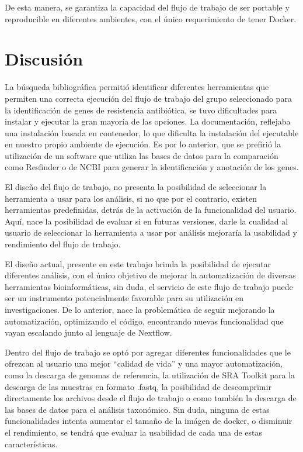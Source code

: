 \documentclass[12pt]{article}
\begin{document}
De esta manera, se garantiza la capacidad del flujo de trabajo de ser portable y 
reproducible en diferentes ambientes, con el único requerimiento de tener Docker.

\newpage
\section{Discusión}
La búsqueda bibliográfica permitió identificar diferentes herramientas que permiten
 una correcta ejecución del flujo de trabajo del grupo seleccionado para la 
 identificación de genes de resistencia antibiótica, se tuvo dificultades para 
 instalar y ejecutar la gran mayoría de las opciones. La documentación, reflejaba 
 una instalación basada en contenedor, lo que dificulta la instalación del ejecutable 
 en nuestro propio ambiente de ejecución. Es por lo anterior, que se prefirió la utilización 
 de un software que utiliza las bases de datos para la comparación como Resfinder 
 o de NCBI para generar la identificación y anotación de los genes. 

El diseño del flujo de trabajo, no presenta la posibilidad de seleccionar la 
herramienta a usar para los análisis, si no que por el contrario, existen 
herramientas predefinidas, detrás de la activación de la funcionalidad del usuario. 
Aquí, nace la posibilidad  de evaluar si en futuras versiones, darle la 
cualidad al usuario de seleccionar la herramienta a usar por análisis mejoraría 
la usabilidad y rendimiento del flujo de trabajo. 

El diseño actual, presente en este trabajo brinda la posibilidad de 
ejecutar diferentes análisis, con el único objetivo de mejorar la automatización de 
diversas herramientas bioinformáticas, sin duda, el servicio de este flujo de trabajo 
puede ser un instrumento potencialmente favorable para su utilización en 
investigaciones. De lo anterior, nace la problemática de seguir mejorando la 
automatización, optimizando el código, encontrando nuevas funcionalidad que vayan 
escalando junto al lenguaje de Nextflow.

Dentro del flujo de trabajo se optó por agregar diferentes funcionalidades que le 
ofrezcan al usuario una mejor “calidad de vida” y una mayor automatización, como la 
descarga de genomas de referencia, la utilización de SRA Toolkit para la descarga de 
las muestras en formato .fastq, la posibilidad de descomprimir directamente los 
archivos desde el flujo de trabajo o como también la descarga de las bases de datos 
para el análisis taxonómico. Sin duda, ninguna de estas funcionalidades intenta 
aumentar el tamaño de la imágen de docker, o disminuir el rendimiento, se tendrá que 
evaluar la usabilidad de cada una de estas características.
\end{document}
